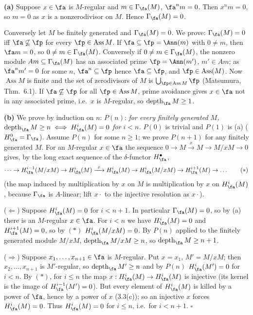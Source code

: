 \documentclass[11pt]{article}
\begin{document}
\textbf{(a)} Suppose $x\in\fa$ is $M$-regular and $m\in\Gamma_{\fa}(M)$, $\fa^nm=0$. Then $x^nm=0$, so $m=0$ as $x$ is a nonzerodivisor on $M$. Hence $\Gamma_{\fa}(M)=0$.

Conversely let $M$ be finitely generated and $\Gamma_{\fa}(M)=0$. We prove: $\Gamma_{\fa}(M)=0$ iff $\fa\not\subseteq\fp$ for every $\fp\in\operatorname{Ass}M$. If $\fa\subseteq\fp=\Ann(m)$ with $0\ne m$, then $\fa m=0$, so $0\neq m\in\Gamma_{\fa}(M)$. Conversely if $0\ne m\in\Gamma_{\fa}(M)$, the nonzero module $Am\subseteq\Gamma_{\fa}(M)$ has an associated prime $\fp=\Ann(m')$, $m'\in Am$; as $\fa^nm'=0$ for some $n$, $\fa^n\subseteq\fp$ hence $\fa\subseteq\fp$, and $\fp\in\operatorname{Ass}(M)$. Now $\operatorname{Ass}M$ is finite and the set of zerodivisors of $M$ is $\bigcup_{\fp\in\operatorname{Ass}M}\fp$ (Matsumura, Thm.~6.1). If $\fa\not\subseteq\fp$ for all $\fp\in\operatorname{Ass}M$, prime avoidance gives $x\in\fa$ not in any associated prime, i.e.\ $x$ is $M$-regular, so $\operatorname{depth}_{\fa}M\ge1$.

\textbf{(b)} We prove by induction on $n$: $P(n)$: \emph{for every finitely generated $M$, $\operatorname{depth}_{\fa}M\ge n\iff H^i_{\fa}(M)=0$ for $i<n$.} $P(0)$ is trivial and $P(1)$ is (a) ($H^0_{\fa}=\Gamma_{\fa}$). Assume $P(n)$ for some $n\ge1$; we prove $P(n+1)$ for any finitely generated $M$. For an $M$-regular $x\in\fa$ the sequence $0\to M\xrightarrow{x}M\to M/xM\to0$ gives, by the long exact sequence of the $\delta$-functor $H^\bullet_{\fa}$,
\[
\dots\to H^{i-1}_{\fa}(M/xM)\to H^i_{\fa}(M)\xrightarrow{\ x\ }H^i_{\fa}(M)\to H^i_{\fa}(M/xM)\to H^{i+1}_{\fa}(M)\to\dots\tag{$*$}
\]
(the map induced by multiplication by $x$ on $M$ is multiplication by $x$ on $H^i_{\fa}(M)$, because $\Gamma_{\fa}$ is $A$-linear; lift $x\cdot$ to the injective resolution as $x\cdot$).

($\Leftarrow$) Suppose $H^i_{\fa}(M)=0$ for $i<n+1$. In particular $\Gamma_{\fa}(M)=0$, so by (a) there is an $M$-regular $x\in\fa$. For $i<n$ we have $H^i_{\fa}(M)=0$ and $H^{i+1}_{\fa}(M)=0$, so by $(*)$ $H^i_{\fa}(M/xM)=0$. By $P(n)$ applied to the finitely generated module $M/xM$, $\operatorname{depth}_{\fa}M/xM\ge n$, so $\operatorname{depth}_{\fa}M\ge n+1$.

($\Rightarrow$) Suppose $x_1,\dots,x_{n+1}\in\fa$ is $M$-regular. Put $x=x_1$, $M'=M/xM$; then $x_2,\dots,x_{n+1}$ is $M'$-regular, so $\operatorname{depth}_{\fa}M'\ge n$ and by $P(n)$ $H^i_{\fa}(M')=0$ for $i<n$. By $(*)$, for $i\le n$ the map $x:H^i_{\fa}(M)\to H^i_{\fa}(M)$ is injective (its kernel is the image of $H^{i-1}_{\fa}(M')=0$). But every element of $H^i_{\fa}(M)$ is killed by a power of $\fa$, hence by a power of $x$ (3.3(c)); so an injective $x$ forces $H^i_{\fa}(M)=0$. Thus $H^i_{\fa}(M)=0$ for $i\le n$, i.e.\ for $i<n+1$. \hfill$\square$
\end{document}

